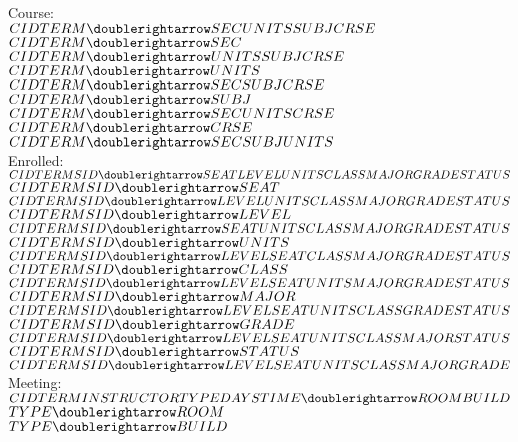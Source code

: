 Course: \\
$CID TERM \doublerightarrow SEC UNITS SUBJ CRSE$ \\
$CID TERM \doublerightarrow SEC$ \\
$CID TERM \doublerightarrow UNITS SUBJ CRSE$ \\
$CID TERM \doublerightarrow UNITS$ \\
$CID TERM \doublerightarrow SEC SUBJ CRSE$\\
$CID TERM \doublerightarrow SUBJ$ \\
$CID TERM \doublerightarrow SEC UNITS CRSE$ \\
$CID TERM \doublerightarrow CRSE$ \\
$CID TERM \doublerightarrow SEC SUBJ UNITS$ \\

Enrolled: \\

$CID TERM SID \doublerightarrow SEAT LEVEL UNITS CLASS MAJOR GRADE STATUS$ \\
$CID TERM SID \doublerightarrow SEAT$ \\
$CID TERM SID \doublerightarrow LEVEL UNITS CLASS MAJOR GRADE STATUS$\\
$CID TERM SID \doublerightarrow LEVEL$ \\
$CID TERM SID \doublerightarrow SEAT UNITS CLASS MAJOR GRADE STATUS$\\
$CID TERM SID \doublerightarrow UNITS$\\
$CID TERM SID \doublerightarrow LEVEL SEAT CLASS MAJOR GRADE STATUS$ \\
$CID TERM SID \doublerightarrow CLASS$\\
$CID TERM SID \doublerightarrow LEVEL SEAT UNITS MAJOR GRADE STATUS$ \\
$CID TERM SID \doublerightarrow MAJOR$\\
$CID TERM SID \doublerightarrow LEVEL SEAT UNITS CLASS GRADE STATUS$\\
$CID TERM SID \doublerightarrow GRADE$\\
$CID TERM SID \doublerightarrow LEVEL SEAT UNITS CLASS MAJOR STATUS$ \\
$CID TERM SID \doublerightarrow STATUS$\\
$CID TERM SID \doublerightarrow LEVEL SEAT UNITS CLASS MAJOR GRADE$ \\

Meeting: \\
$CID TERM INSTRUCTOR TYPE DAYS TIME \doublerightarrow ROOM BUILD$ \\
$TYPE \doublerightarrow ROOM$ \\
$TYPE \doublerightarrow BUILD$ \\
